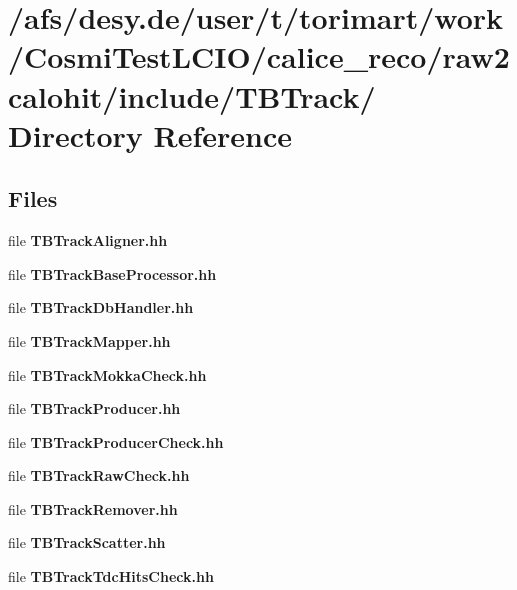 \section{/afs/desy.de/user/t/torimart/work/CosmiTestLCIO/calice\_\-reco/raw2calohit/include/TBTrack/ Directory Reference}
\label{dir_27c5b49142729854eb36ae85f823b406}
\subsection*{Files}
\begin{DoxyCompactItemize}
\item 
file {\bfseries TBTrackAligner.hh}
\item 
file {\bfseries TBTrackBaseProcessor.hh}
\item 
file {\bfseries TBTrackDbHandler.hh}
\item 
file {\bfseries TBTrackMapper.hh}
\item 
file {\bfseries TBTrackMokkaCheck.hh}
\item 
file {\bfseries TBTrackProducer.hh}
\item 
file {\bfseries TBTrackProducerCheck.hh}
\item 
file {\bfseries TBTrackRawCheck.hh}
\item 
file {\bfseries TBTrackRemover.hh}
\item 
file {\bfseries TBTrackScatter.hh}
\item 
file {\bfseries TBTrackTdcHitsCheck.hh}
\end{DoxyCompactItemize}
